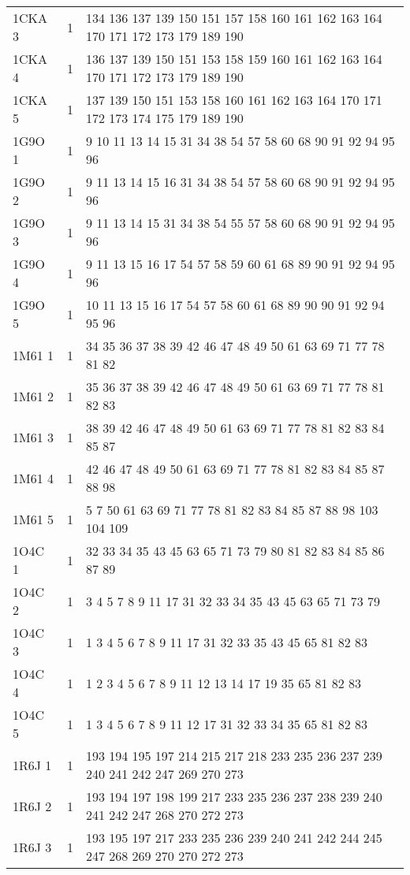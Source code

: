 \begin{table}[!htbp]
{\begin{tabular}{lll}
        1CKA 3 & 1 & 134 136 137 139 150 151 157 158 160 161 162 163 164 170 171 172 173 179 189 190 \\
        1CKA 4 & 1 & 136 137 139 150 151 153 158 159 160 161 162 163 164 170 171 172 173 179 189 190 \\
        1CKA 5 & 1 & 137 139 150 151 153 158 160 161 162 163 164 170 171 172 173 174 175 179 189 190 \\
        1G9O 1 & 1 & 9 10 11 13 14 15 31 34 38 54 57 58 60 68 90 91 92 94 95 96 \\
        1G9O 2 & 1 & 9 11 13 14 15 16 31 34 38 54 57 58 60 68 90 91 92 94 95 96 \\
        1G9O 3 & 1 & 9 11 13 14 15 31 34 38 54 55 57 58 60 68 90 91 92 94 95 96 \\
        1G9O 4 & 1 & 9 11 13 15 16 17 54 57 58 59 60 61 68 89 90 91 92 94 95 96 \\
        1G9O 5 & 1 & 10 11 13 15 16 17 54 57 58 60 61 68 89 90 90 91 92 94 95 96 \\
        1M61 1 & 1 & 34 35 36 37 38 39 42 46 47 48 49 50 61 63 69 71 77 78 81 82 \\
        1M61 2 & 1 & 35 36 37 38 39 42 46 47 48 49 50 61 63 69 71 77 78 81 82 83 \\
        1M61 3 & 1 & 38 39 42 46 47 48 49 50 61 63 69 71 77 78 81 82 83 84 85 87 \\
        1M61 4 & 1 & 42 46 47 48 49 50 61 63 69 71 77 78 81 82 83 84 85 87 88 98 \\
        1M61 5 & 1 & 5 7 50 61 63 69 71 77 78 81 82 83 84 85 87 88 98 103 104 109 \\
        1O4C 1 & 1 & 32 33 34 35 43 45 63 65 71 73 79 80 81 82 83 84 85 86 87 89 \\
        1O4C 2 & 1 & 3 4 5 7 8 9 11 17 31 32 33 34 35 43 45 63 65 71 73 79 \\
        1O4C 3 & 1 & 1 3 4 5 6 7 8 9 11 17 31 32 33 35 43 45 65 81 82 83 \\
        1O4C 4 & 1 & 1 2 3 4 5 6 7 8 9 11 12 13 14 17 19 35 65 81 82 83 \\
        1O4C 5 & 1 & 1 3 4 5 6 7 8 9 11 12 17 31 32 33 34 35 65 81 82 83 \\
        1R6J 1 & 1 & 193 194 195 197 214 215 217 218 233 235 236 237 239 240 241 242 247 269 270 273 \\
        1R6J 2 & 1 & 193 194 197 198 199 217 233 235 236 237 238 239 240 241 242 247 268 270 272 273 \\
        1R6J 3 & 1 & 193 195 197 217 233 235 236 239 240 241 242 244 245 247 268 269 270 270 272 273 \\

\end{tabular}}
\end{table}
